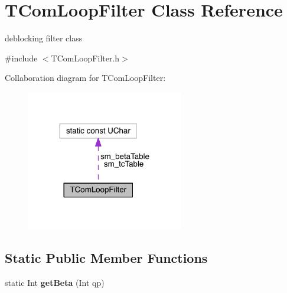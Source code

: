 \hypertarget{class_t_com_loop_filter}{}\section{T\+Com\+Loop\+Filter Class Reference}
\label{class_t_com_loop_filter}


deblocking filter class  




{\ttfamily \#include $<$T\+Com\+Loop\+Filter.\+h$>$}



Collaboration diagram for T\+Com\+Loop\+Filter\+:
\nopagebreak
\begin{figure}[H]
\begin{center}
\leavevmode
\includegraphics[width=194pt]{d1/d9a/class_t_com_loop_filter__coll__graph}
\end{center}
\end{figure}
\subsection*{Static Public Member Functions}
\begin{DoxyCompactItemize}
\item 
\mbox{\label{class_t_com_loop_filter_ae9b8a496c08a8ab251d04202f885a506}} 
static Int {\bfseries get\+Beta} (Int qp)
\end{DoxyCompactItemize}
